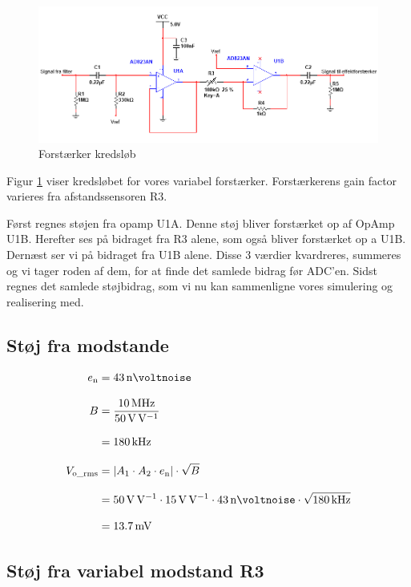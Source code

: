 \documentclass[a4paper, 11pt, article,oneside,openany]{memoir} %
\newcommand{\tsub}[1]{_{\textup{#1}}}
\begin{document}
\begin{figure}[ht] %
	\centering
	\includegraphics[width=\textwidth]{figure/kreds1}
	\caption{Forstærker kredsløb}
	\label{fig:kreds1}
\end{figure}
Figur \ref{fig:kreds1} viser kredsløbet for vores variabel forstærker. Forstærkerens gain factor varieres fra afstandssensoren R3.

Først regnes støjen fra opamp U1A. Denne støj bliver forstærket op af OpAmp U1B. Herefter ses på bidraget fra R3 alene, som også bliver forstærket op a U1B. Dernæst ser vi på bidraget fra U1B alene. Disse 3 værdier kvardreres, summeres og vi tager roden af dem, for at finde det samlede bidrag før ADC'en. Sidst regnes det samlede støjbidrag, som vi nu kan sammenligne vores simulering og realisering med.

\subsection{Støj fra modstande}


\begin{align*}
	
	
	
	
	
	
e\tsub{n} &= \SI{43}{\nano\voltnoise}
\\[2.0ex]
B &= \frac{ \SI{10}{\mega\hertz}}{\SI{50}{\volt\per\volt}}
\\[2.0ex]
&= \SI{180}{\kilo\hertz}
\\[2.0ex]
V\tsub{o\_rms} &= \left| A_1\cdot A_2 \cdot e\tsub{n} \right| \cdot \sqrt{B}
\\[2.0ex]
&= \SI{50}{\volt\per\volt} \cdot \SI{15}{\volt\per\volt} \cdot \SI{43}{\nano\voltnoise} \cdot \sqrt{\SI{180}{\kilo\hertz}}
\\[2.0ex]
&= \SI{13.7}{\milli\volt}
\end{align*}


\subsection{Støj fra variabel modstand R3}
\end{document}
